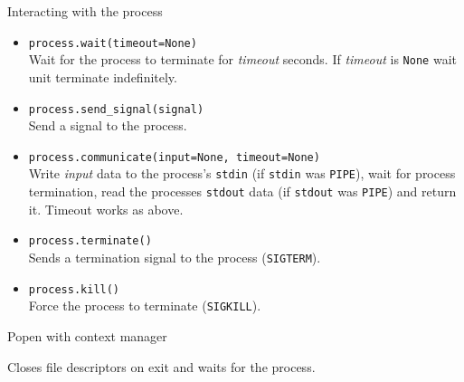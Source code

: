 \begin{frame}{Interacting with the process}

\begin{itemize}
\item
  \texttt{process.wait(timeout=None)}\\Wait for the process to terminate
  for \emph{timeout} seconds. If \emph{timeout} is \texttt{None} wait
  unit terminate indefinitely.
\item
  \texttt{process.send\_signal(signal)}\\Send a signal to the process.
\end{itemize}

\end{frame}

\begin{frame}

\begin{itemize}
\itemsep1pt\parskip0pt
\item
  \texttt{process.communicate(input=None,\ timeout=None)}\\Write
  \emph{input} data to the process's \texttt{stdin} (if \texttt{stdin}
  was \texttt{PIPE}), wait for process termination, read the processes
  \texttt{stdout} data (if \texttt{stdout} was \texttt{PIPE}) and return
  it. Timeout works as above.
\end{itemize}

\end{frame}

\begin{frame}

\begin{itemize}
\item
  \texttt{process.terminate()}\\Sends a termination signal to the
  process (\texttt{SIGTERM}).
\item
  \texttt{process.kill()}\\Force the process to terminate
  (\texttt{SIGKILL}).
\end{itemize}

\end{frame}

\begin{frame}[fragile]{Popen with context manager}

\begin{Shaded}
\begin{Highlighting}[]
 \NormalTok{subprocess.Popen([}\NormalTok{]) } 
\end{Highlighting}
\end{Shaded}

Closes file descriptors on exit and waits for the process.

\end{frame}

